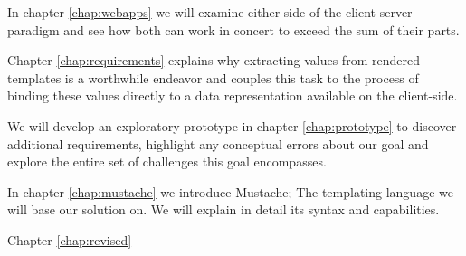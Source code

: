 \documentclass[thesis.tex]{subfiles}
\begin{document}
In chapter \ref{chap:webapps} we will examine either side of the client-server
paradigm and see how both can work in concert to exceed the sum of their parts.

Chapter \ref{chap:requirements} explains why extracting values from rendered
templates is a worthwhile endeavor and couples this task to the process of
binding these values directly to a data representation available on the
client-side.

We will develop an exploratory prototype in chapter \ref{chap:prototype} to
discover additional requirements, highlight any conceptual errors about our
goal and explore the entire set of challenges this goal encompasses.

In chapter \ref{chap:mustache} we introduce Mustache;
The templating language we will base our solution on. We will explain in detail
its syntax and capabilities.


Chapter \ref{chap:revised}





\end{document}
